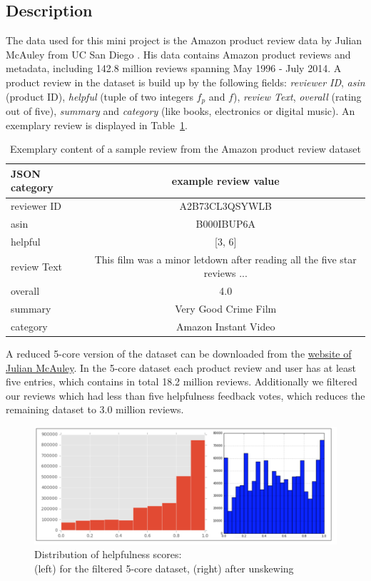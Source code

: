 \documentclass[a4paper,11pt]{article}
\begin{document}
\subsection{Description}

The data used for this mini project is the Amazon product review data by Julian McAuley from UC San Diego \cite{HeMcA16a} \cite{McATarShiHen15}. His data contains Amazon product reviews and metadata, including 142.8 million reviews spanning May 1996 - July 2014.
A product review in the dataset is build up by the following fields: \textit{reviewer ID}, \textit{asin} (product ID), \textit{helpful} (tuple of two integers $f_p$ and $f$), \textit{review Text}, \textit{overall} (rating out of five), \textit{summary} and \textit{category} (like books, electronics or digital music).
An exemplary review is displayed in Table~\ref{tab:JSON}. 

\begin{table}[h!]
\centering
 \begin{tabular}{l |c}
 JSON category & example review value \\ \hline
 reviewer ID & A2B73CL3QSYWLB \\ 
 asin & B000IBUP6A \\ 
 helpful & [3, 6] \\ 
review Text & This film was a minor letdown after reading all the five star reviews ... \\ 
 overall & 4.0 \\ 
 summary & Very Good Crime Film \\ 
 category & Amazon Instant Video
 \end{tabular}
 \captionsetup{justification=centering,margin=2cm}
 \caption{ Exemplary content of a sample review from the Amazon product review dataset}
 \label{tab:JSON}
\end{table}

A reduced 5-core version of the dataset can be downloaded from the \href{http://jmcauley.ucsd.edu/data/amazon/links.html}{website of Julian McAuley}. In the 5-core dataset each product review and user has at least five entries, which contains in total 18.2 million reviews. Additionally we filtered our reviews which had less than five helpfulness feedback votes, which reduces the remaining dataset to 3.0 million reviews.

\begin{figure}[h!]
\centering
\includegraphics[width=0.7\linewidth]{pics/data_distribution.png}
\captionsetup{justification=centering,margin=2cm}
\caption{Distribution of helpfulness scores: \\ (left) for the filtered 5-core dataset, (right) after unskewing}
\label{pic:distri}
\end{figure}
\end{document}
